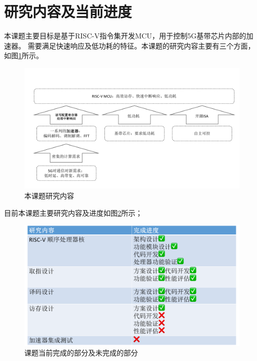 \documentclass[a4paper, 12pt]{article}
\begin{document}
\section{研究内容及当前进度}%
本课题主要目标是基于RISC-V指令集开发MCU，用于控制5G基带芯片内部的加速器\cite{9319703}。
需要满足快速响应及低功耗的特征。本课题的研究内容主要有三个方面，如图\ref{fig:research_topics}所示。
\begin{figure}[htbp]
  \centering
  \includegraphics[width=0.8\linewidth]{./images/research_topics.pdf}
  \caption{本课题研究内容}
  \label{fig:research_topics}
\end{figure}

目前本课题主要研究内容及进度如图\ref{fig:study_progress}所示；%

\begin{figure}[htbp]
  \centering
  \includegraphics[width=\linewidth]{./images/study_progress.pdf}
  \caption{课题当前完成的部分及未完成的部分}
  \label{fig:study_progress}
\end{figure}

\end{document}
